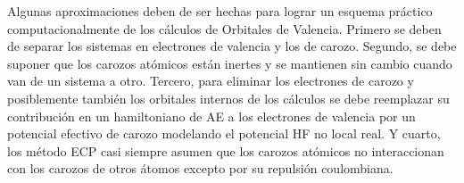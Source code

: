 Algunas aproximaciones deben de ser hechas para lograr un esquema 
pr\'actico computacionalmente de los c\'alculos de Orbitales de 
Valencia. Primero se deben de separar los sistemas en electrones de 
valencia y los de carozo. Segundo, se debe suponer que los carozos 
at\'omicos est\'an inertes y se mantienen sin cambio cuando van de un
sistema a otro. Tercero, para eliminar los electrones de carozo y 
posiblemente tambi\'en los orbitales internos de los c\'alculos se 
debe reemplazar su contribuci\'on en un hamiltoniano de AE a los 
electrones de valencia por un potencial efectivo de carozo modelando 
el potencial HF no local real. Y cuarto, los m\'etodo ECP casi 
siempre asumen que los carozos at\'omicos no interaccionan con los 
carozos de otros \'atomos excepto por su repulsi\'on coulombiana.

{\normalsize
}

